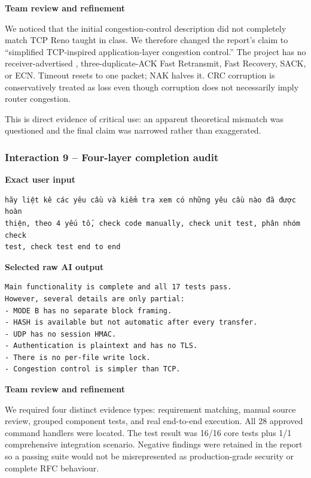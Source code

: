 \textbf{Team review and refinement}

We noticed that the initial congestion-control description did not completely
match TCP Reno taught in class. We therefore changed the report's claim to
``simplified TCP-inspired application-layer congestion control.'' The project
has no receiver-advertised , three-duplicate-ACK Fast Retransmit,
Fast Recovery, SACK, or ECN. Timeout resets  to one packet; NAK
halves it. CRC corruption is conservatively treated as loss even though
corruption does not necessarily imply router congestion.

This is direct evidence of critical use: an apparent theoretical mismatch was
questioned and the final claim was narrowed rather than exaggerated.

\subsubsection{Interaction 9 -- Four-layer completion audit}

\sourceB

\textbf{Exact user input}

\begin{lstlisting}
hãy liệt kê các yêu cầu và kiểm tra xem có những yêu cầu nào đã được hoàn
thiện, theo 4 yếu tố, check code manually, check unit test, phân nhóm check
test, check test end to end
\end{lstlisting}

\textbf{Selected raw AI output}

\begin{lstlisting}
Main functionality is complete and all 17 tests pass.
However, several details are only partial:
- MODE B has no separate block framing.
- HASH is available but not automatic after every transfer.
- UDP has no session HMAC.
- Authentication is plaintext and has no TLS.
- There is no per-file write lock.
- Congestion control is simpler than TCP.
\end{lstlisting}

\textbf{Team review and refinement}

We required four distinct evidence types: requirement matching, manual source
review, grouped component tests, and real end-to-end execution. All 28
approved command handlers were located. The test result was 16/16 core tests
plus 1/1 comprehensive integration scenario. Negative findings were retained
in the report so a passing suite would not be misrepresented as
production-grade security or complete RFC behaviour.

